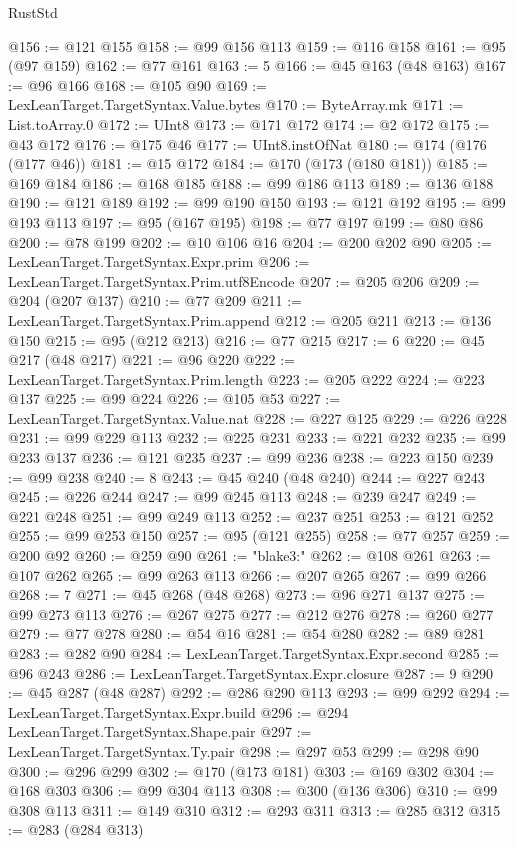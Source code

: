 \begin{lexlean}{RustStd}
\begin{coremodule}
@156 := @121 @155
@158 := @99 @156 @113
@159 := @116 @158
@161 := @95 (@97 @159)
@162 := @77 @161
@163 := 5
@166 := @45 @163 (@48 @163)
@167 := @96 @166
@168 := @105 @90
@169 := LexLeanTarget.TargetSyntax.Value.bytes
@170 := ByteArray.mk
@171 := List.toArray.{0}
@172 := UInt8
@173 := @171 @172
@174 := @2 @172
@175 := @43 @172
@176 := @175 @46
@177 := UInt8.instOfNat
@180 := @174 (@176 (@177 @46))
@181 := @15 @172
@184 := @170 (@173 (@180 @181))
@185 := @169 @184
@186 := @168 @185
@188 := @99 @186 @113
@189 := @136 @188
@190 := @121 @189
@192 := @99 @190 @150
@193 := @121 @192
@195 := @99 @193 @113
@197 := @95 (@167 @195)
@198 := @77 @197
@199 := @80 @86
@200 := @78 @199
@202 := @10 @106 @16
@204 := @200 @202 @90
@205 := LexLeanTarget.TargetSyntax.Expr.prim
@206 := LexLeanTarget.TargetSyntax.Prim.utf8Encode
@207 := @205 @206
@209 := @204 (@207 @137)
@210 := @77 @209
@211 := LexLeanTarget.TargetSyntax.Prim.append
@212 := @205 @211
@213 := @136 @150
@215 := @95 (@212 @213)
@216 := @77 @215
@217 := 6
@220 := @45 @217 (@48 @217)
@221 := @96 @220
@222 := LexLeanTarget.TargetSyntax.Prim.length
@223 := @205 @222
@224 := @223 @137
@225 := @99 @224
@226 := @105 @53
@227 := LexLeanTarget.TargetSyntax.Value.nat
@228 := @227 @125
@229 := @226 @228
@231 := @99 @229 @113
@232 := @225 @231
@233 := @221 @232
@235 := @99 @233 @137
@236 := @121 @235
@237 := @99 @236
@238 := @223 @150
@239 := @99 @238
@240 := 8
@243 := @45 @240 (@48 @240)
@244 := @227 @243
@245 := @226 @244
@247 := @99 @245 @113
@248 := @239 @247
@249 := @221 @248
@251 := @99 @249 @113
@252 := @237 @251
@253 := @121 @252
@255 := @99 @253 @150
@257 := @95 (@121 @255)
@258 := @77 @257
@259 := @200 @92
@260 := @259 @90
@261 := "blake3:"
@262 := @108 @261
@263 := @107 @262
@265 := @99 @263 @113
@266 := @207 @265
@267 := @99 @266
@268 := 7
@271 := @45 @268 (@48 @268)
@273 := @96 @271 @137
@275 := @99 @273 @113
@276 := @267 @275
@277 := @212 @276
@278 := @260 @277
@279 := @77 @278
@280 := @54 @16
@281 := @54 @280
@282 := @89 @281
@283 := @282 @90
@284 := LexLeanTarget.TargetSyntax.Expr.second
@285 := @96 @243
@286 := LexLeanTarget.TargetSyntax.Expr.closure
@287 := 9
@290 := @45 @287 (@48 @287)
@292 := @286 @290 @113
@293 := @99 @292
@294 := LexLeanTarget.TargetSyntax.Expr.build
@296 := @294 LexLeanTarget.TargetSyntax.Shape.pair
@297 := LexLeanTarget.TargetSyntax.Ty.pair
@298 := @297 @53
@299 := @298 @90
@300 := @296 @299
@302 := @170 (@173 @181)
@303 := @169 @302
@304 := @168 @303
@306 := @99 @304 @113
@308 := @300 (@136 @306)
@310 := @99 @308 @113
@311 := @149 @310
@312 := @293 @311
@313 := @285 @312
@315 := @283 (@284 @313)

\end{coremodule}
\end{lexlean}
